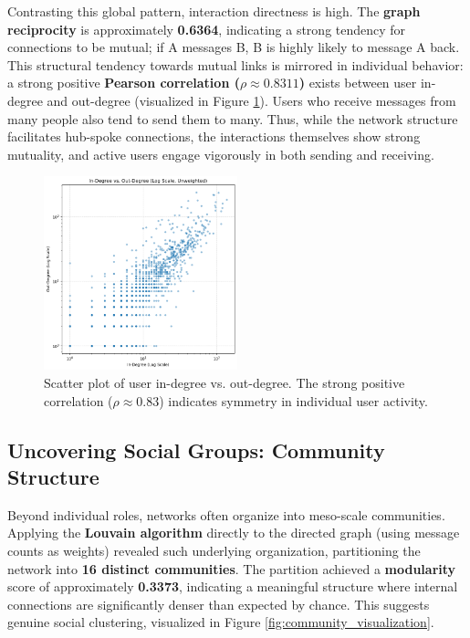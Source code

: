 Contrasting this global pattern, interaction directness is high. The \textbf{graph reciprocity} is approximately \textbf{0.6364}, indicating a strong tendency for connections to be mutual; if A messages B, B is highly likely to message A back. This structural tendency towards mutual links is mirrored in individual behavior: a strong positive \textbf{Pearson correlation ($\rho \approx 0.8311$)} exists between user in-degree and out-degree (visualized in Figure \ref{fig:in_out_corr}). Users who receive messages from many people also tend to send them to many. Thus, while the network structure facilitates hub-spoke connections, the interactions themselves show strong mutuality, and active users engage vigorously in both sending and receiving.

\begin{figure}[h!]
    \centering
    \includegraphics[width=0.5\textwidth]{../inoutdegree.png}
    \caption{Scatter plot of user in-degree vs. out-degree. The strong positive correlation ($\rho \approx 0.83$) indicates symmetry in individual user activity.}
    \label{fig:in_out_corr}
\end{figure}



\subsection{Uncovering Social Groups: Community Structure}
\label{sec:community_structure}

Beyond individual roles, networks often organize into meso-scale communities. Applying the \textbf{Louvain algorithm} directly to the directed graph (using message counts as weights) revealed such underlying organization, partitioning the network into \textbf{16 distinct communities}. The partition achieved a \textbf{modularity} score of approximately \textbf{0.3373}, indicating a meaningful structure where internal connections are significantly denser than expected by chance. This suggests genuine social clustering, visualized in Figure \ref{fig:community_visualization}.

